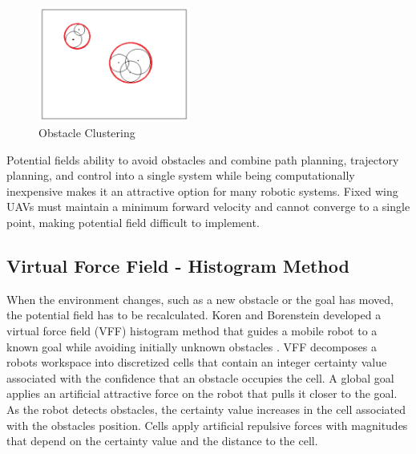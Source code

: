 \documentclass[numbered,pdftex]{ohio-etd}
\begin{document}
\begin{figure}[H]
	\centering
	\includegraphics[width=5cm]{PaperFigures/obstacleClustering}
	\caption{Obstacle Clustering \cite{liu_virtual-waypoint_2016}}
	\label{fig:obstacleclustering}
\end{figure}

Potential fields ability to avoid obstacles and combine path planning, trajectory planning, and control into a single system while being computationally inexpensive makes it an attractive option for many robotic systems. Fixed wing UAVs must maintain a minimum forward velocity and cannot converge to a single point, making potential field difficult to implement. 







\subsection{Virtual Force Field - Histogram Method}
When the environment changes, such as a new obstacle or the goal has moved, the potential field has to be recalculated. Koren and Borenstein developed a virtual force field (VFF) histogram method that guides a mobile robot to a known goal while avoiding initially unknown obstacles \cite{borenstein_real-time_1990}. VFF decomposes a robots workspace into discretized cells that contain an integer certainty value associated with the confidence that an obstacle occupies the cell. A global goal applies an artificial attractive force on the robot that pulls it closer to the goal. As the robot detects obstacles, the certainty value increases in the cell associated with the obstacles position. Cells apply artificial repulsive forces with magnitudes that depend on the certainty value and the distance to the cell. 
\end{document}
